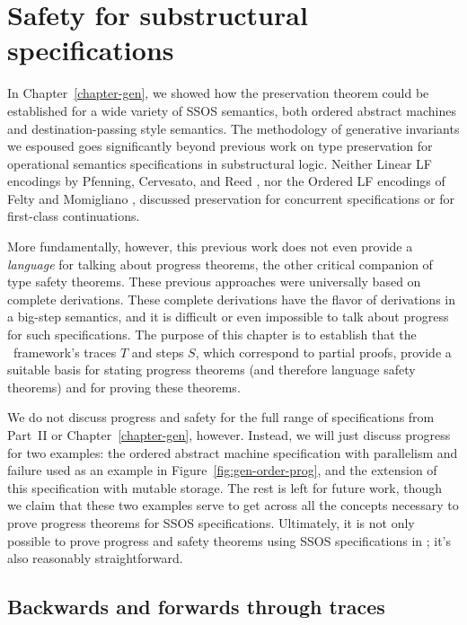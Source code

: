 \chapter{Safety for substructural specifications}
\label{chapter-safety}

In Chapter~\ref{chapter-gen}, we showed how the preservation theorem
could be established for a wide variety of SSOS semantics, both
ordered abstract machines and destination-passing style semantics.
The methodology of generative invariants we espoused goes
significantly beyond previous work on type preservation for
operational semantics specifications in substructural logic.  Neither
Linear LF encodings by Pfenning, Cervesato, and Reed
\cite{cervesato02linear,reed09hybrid}, nor the Ordered LF encodings of
Felty and Momigliano \cite{felty12hybrid}, discussed preservation for
concurrent specifications or for first-class continuations. 

More fundamentally, however, this previous work does not even provide
a {\it language} for talking about progress theorems, the other critical
companion of type safety theorems.  These previous approaches
were universally based on complete derivations. These
complete derivations have the flavor
of derivations in a big-step semantics, and it is difficult or even
impossible to talk about progress for such specifications. The purpose
of this chapter is to establish that the \sls~framework's traces $T$
and steps $S$, which correspond to partial proofs, provide a suitable
basis for stating progress theorems (and therefore language safety
theorems) and for proving these theorems.

We do not discuss progress and safety for the full range of
specifications from Part~II or Chapter~\ref{chapter-gen},
however. Instead, we will just discuss progress for two examples: the
ordered abstract machine specification with parallelism and failure
used as an example in Figure~\ref{fig:gen-order-prog}, and the
extension of this specification with mutable storage. The rest is left
for future work, though we claim that these two examples serve to get
across all the concepts necessary to prove progress theorems for SSOS
specifications. Ultimately, it is not only possible to prove progress
and safety theorems using SSOS specifications in \sls; it's also
reasonably straightforward.

\section{Backwards and forwards through traces}

